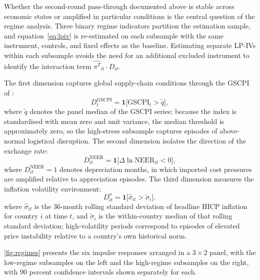 Whether the second-round pass-through documented above is stable across economic states
or amplified in particular conditions is the central question of the regime analysis.
Three binary regime indicators partition the estimation sample, and equation~\eqref{eq:lpiv}
is re-estimated on each subsample with the same instrument, controls, and fixed effects as
the baseline.
Estimating separate LP-IVs within each subsample avoids the need for an additional excluded
instrument to identify the interaction term $\widehat{\pi^T}_{it}\cdot D_{it}$.

The first dimension captures global supply-chain conditions through the GSCPI of
\citet{benigno2022}:
\begin{equation*}
    D^{\mathrm{GSCPI}}_t = \mathbf{1}\bigl[\mathrm{GSCPI}_t > \tilde{q}\bigr],
\end{equation*}
where $\tilde{q}$ denotes the panel median of the GSCPI series; because the index is
standardised with mean zero and unit variance, the median threshold is approximately zero,
so the high-stress subsample captures episodes of above-normal logistical disruption.
The second dimension isolates the direction of the exchange rate:
\begin{equation*}
    D^{\mathrm{NEER}}_{it} = \mathbf{1}\bigl[\Delta\ln\mathrm{NEER}_{it} < 0\bigr],
\end{equation*}
where $D^{\mathrm{NEER}}_{it} = 1$ denotes depreciation months, in which imported cost
pressures are amplified relative to appreciation episodes.
The third dimension measures the inflation volatility environment:
\begin{equation*}
    D^{\sigma}_{it} = \mathbf{1}\bigl[\hat{\sigma}_{it} > \tilde{\sigma}_i\bigr],
\end{equation*}
where $\hat{\sigma}_{it}$ is the 36-month rolling standard deviation of headline HICP
inflation for country $i$ at time $t$, and $\tilde{\sigma}_i$ is the within-country
median of that rolling standard deviation; high-volatility periods correspond to episodes
of elevated price instability relative to a country's own historical norm.

\autoref{fig:regimes} presents the six impulse responses arranged in a $3\times 2$ panel,
with the low-regime subsamples on the left and the high-regime subsamples on the right,
with 90 percent confidence intervals shown separately for each.

